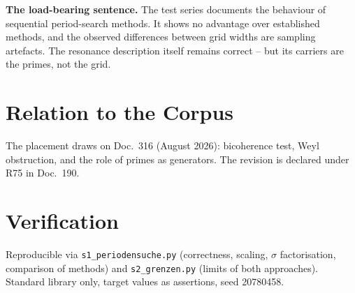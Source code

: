 \textbf{The load-bearing sentence.} The test series documents the behaviour of
sequential period-search methods. It shows no advantage over established
methods, and the observed differences between grid widths are sampling
artefacts. The resonance description itself remains correct -- but its carriers
are the primes, not the grid.

\section{Relation to the Corpus}

The placement draws on Doc.~316 (August 2026): bicoherence test, Weyl
obstruction, and the role of primes as generators. The revision is declared
under R75 in Doc.~190.

\section{Verification}

Reproducible via \texttt{s1\_periodensuche.py} (correctness, scaling,
$\sigma$ factorisation, comparison of methods) and
\texttt{s2\_grenzen.py} (limits of both approaches). Standard library only,
target values as assertions, seed 20780458.
